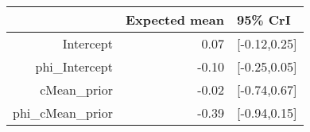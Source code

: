 \begin{tabular}{rrl}
  \hline
 & Expected mean & 95\% CrI \\ 
  \hline
Intercept & 0.07 & [-0.12,0.25] \\ 
  phi\_Intercept & -0.10 & [-0.25,0.05] \\ 
  cMean\_prior & -0.02 & [-0.74,0.67] \\ 
  phi\_cMean\_prior & -0.39 & [-0.94,0.15] \\ 
   \hline
\end{tabular}

